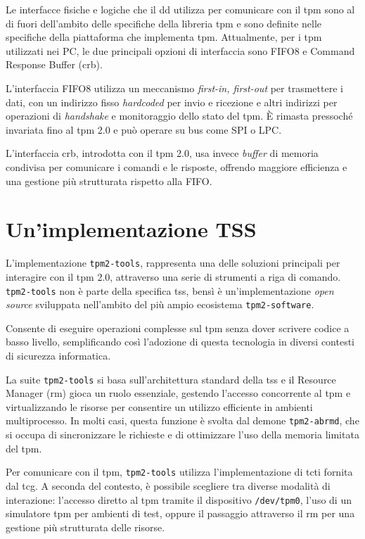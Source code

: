 Le interfacce fisiche e logiche che il \acrshort{dd} utilizza per comunicare con il \acrshort{tpm} sono al di fuori dell'ambito delle specifiche della libreria \acrshort{tpm} e sono definite nelle specifiche della piattaforma che implementa \acrshort{tpm}. Attualmente, per i \acrshort{tpm} utilizzati nei PC, le due principali opzioni di interfaccia sono FIFO8 e Command Response Buffer (\acrshort{crb}). 

L'interfaccia FIFO8 utilizza un meccanismo \textit{first-in, first-out} per trasmettere i dati, con un indirizzo fisso \textit{hardcoded} per invio e ricezione e altri indirizzi per operazioni di \textit{handshake} e monitoraggio dello stato del \acrshort{tpm}. È rimasta pressoché invariata fino al \acrshort{tpm} 2.0 e può operare su bus come SPI o LPC.

L'interfaccia \acrshort{crb}, introdotta con il \acrshort{tpm} 2.0, usa invece \textit{buffer} di memoria condivisa per comunicare i comandi e le risposte, offrendo maggiore efficienza e una gestione più strutturata rispetto alla FIFO.

\section{Un'implementazione TSS}\label{sec:imp_tss}

L'implementazione \texttt{tpm2-tools}, rappresenta una delle soluzioni principali per interagire con il \acrshort{tpm} 2.0, attraverso una serie di strumenti a riga di comando. \texttt{tpm2-tools} non è parte della specifica \acrshort{tss}, bensì è un'implementazione \textit{open source} sviluppata nell'ambito del più ampio ecosistema \texttt{tpm2-software}.

Consente di eseguire operazioni complesse sul \acrshort{tpm} senza dover scrivere codice a basso livello, semplificando così l'adozione di questa tecnologia in diversi contesti di sicurezza informatica.

La suite \texttt{tpm2-tools} si basa sull'architettura standard della \acrshort{tss} e il Resource Manager (\acrshort{rm}) gioca un ruolo essenziale, gestendo l'accesso concorrente al \acrshort{tpm} e virtualizzando le risorse per consentire un utilizzo efficiente in ambienti multiprocesso. In molti casi, questa funzione è svolta dal demone \texttt{tpm2-abrmd}, che si occupa di sincronizzare le richieste e di ottimizzare l'uso della memoria limitata del \acrshort{tpm}.

Per comunicare con il \acrshort{tpm}, \texttt{tpm2-tools} utilizza l'implementazione di \acrshort{tcti} fornita dal \acrshort{tcg}. A seconda del contesto, è possibile scegliere tra diverse modalità di interazione: l'accesso diretto al \acrshort{tpm} tramite il dispositivo \texttt{/dev/tpm0}, l'uso di un simulatore \acrshort{tpm} per ambienti di test, oppure il passaggio attraverso il \acrshort{rm} per una gestione più strutturata delle risorse.


